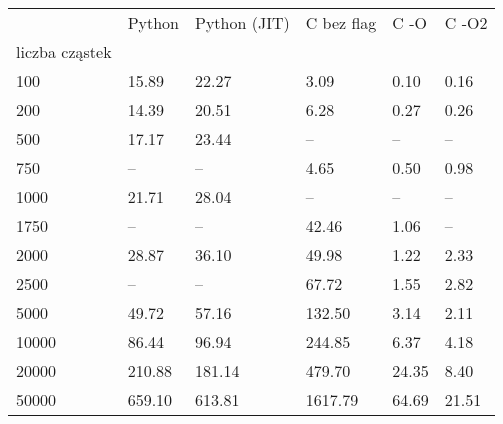 \begin{tabular}{llllll}
\toprule
{} & Python & Python (JIT) & C bez flag &  C -O & C -O2 \\
liczba cząstek &        &              &            &       &       \\
\midrule
100            &  15.89 &        22.27 &       3.09 &  0.10 &  0.16 \\
200            &  14.39 &        20.51 &       6.28 &  0.27 &  0.26 \\
500            &  17.17 &        23.44 &         -- &    -- &    -- \\
750            &     -- &           -- &       4.65 &  0.50 &  0.98 \\
1000           &  21.71 &        28.04 &         -- &    -- &    -- \\
1750           &     -- &           -- &      42.46 &  1.06 &    -- \\
2000           &  28.87 &        36.10 &      49.98 &  1.22 &  2.33 \\
2500           &     -- &           -- &      67.72 &  1.55 &  2.82 \\
5000           &  49.72 &        57.16 &     132.50 &  3.14 &  2.11 \\
10000          &  86.44 &        96.94 &     244.85 &  6.37 &  4.18 \\
20000          & 210.88 &       181.14 &     479.70 & 24.35 &  8.40 \\
50000          & 659.10 &       613.81 &    1617.79 & 64.69 & 21.51 \\
\bottomrule
\end{tabular}
